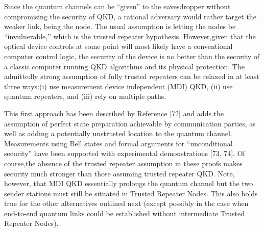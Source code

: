 Since the quantum channels can be “given” to the eavesdropper without compromising the security of QKD, a rational adversary would rather target the weaker link, being the node. The usual assumption is letting the nodes be “invulnerable,” which is the trusted repeater hypothesis. However,given that the optical device controls at some point will most likely have a conventional computer control logic, the security of the device is no better than the security of a classic computer running QKD algorithms and its physical protection.
The admittedly strong assumption of fully trusted repeaters can be relaxed in at least three ways:(i) use measurement device independent (MDI) QKD, (ii) use quantum repeaters, and (iii) rely on multiple paths.

This first approach has been described by Reference [72] and adds the assumption of perfect state preparation achievable by communication parties, as well as adding a potentially unstrusted location to the quantum channel. Measurements using Bell states and formal arguments for “unconditional security” have been supported with experimental demonstrations [73, 74]. Of course,the absence of the trusted repeater assumption in these proofs makes security much stronger than those assuming trusted repeater QKD. Note, however, that MDI QKD essentially prolongs the quantum channel but the two sender stations must still be situated in Trusted Repeater Nodes. This also holds true for the other alternatives outlined next (except possibly in the case when end-to-end quantum links could be established without intermediate Trusted Repeater Nodes).

